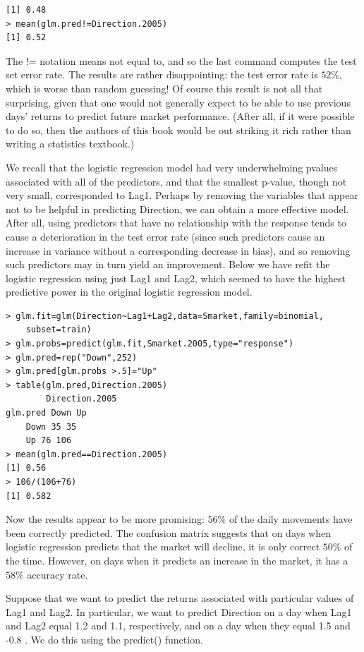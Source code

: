 \documentclass[10pt]{article}
\begin{document}
\begin{verbatim}
[1] 0.48
> mean(glm.pred!=Direction.2005)
[1] 0.52
\end{verbatim}

The != notation means not equal to, and so the last command computes the test set error rate. The results are rather disappointing: the test error rate is $52 \%$, which is worse than random guessing! Of course this result is not all that surprising, given that one would not generally expect to be able to use previous days' returns to predict future market performance. (After all, if it were possible to do so, then the authors of this book would be out striking it rich rather than writing a statistics textbook.)

We recall that the logistic regression model had very underwhelming pvalues associated with all of the predictors, and that the smallest p-value, though not very small, corresponded to Lag1. Perhaps by removing the variables that appear not to be helpful in predicting Direction, we can obtain a more effective model. After all, using predictors that have no relationship with the response tends to cause a deterioration in the test error rate (since such predictors cause an increase in variance without a corresponding decrease in bias), and so removing such predictors may in turn yield an improvement. Below we have refit the logistic regression using just Lag1 and Lag2, which seemed to have the highest predictive power in the original logistic regression model.

\begin{verbatim}
> glm.fit=glm(Direction~Lag1+Lag2,data=Smarket,family=binomial,
    subset=train)
> glm.probs=predict(glm.fit,Smarket.2005,type="response")
> glm.pred=rep("Down",252)
> glm.pred[glm.probs >.5]="Up"
> table(glm.pred,Direction.2005)
        Direction.2005
glm.pred Down Up
    Down 35 35
    Up 76 106
> mean(glm.pred==Direction.2005)
[1] 0.56
> 106/(106+76)
[1] 0.582
\end{verbatim}

Now the results appear to be more promising: $56 \%$ of the daily movements have been correctly predicted. The confusion matrix suggests that on days when logistic regression predicts that the market will decline, it is only correct $50 \%$ of the time. However, on days when it predicts an increase in the market, it has a $58 \%$ accuracy rate.

Suppose that we want to predict the returns associated with particular values of Lag1 and Lag2. In particular, we want to predict Direction on a day when Lag1 and Lag2 equal 1.2 and 1.1, respectively, and on a day when they equal 1.5 and -0.8 . We do this using the predict() function.
\end{document}

